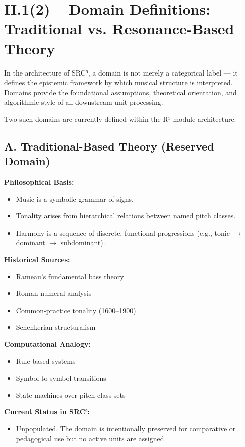 \section*{II.1(2) – Domain Definitions: Traditional vs. Resonance-Based Theory}

In the architecture of SRC⁹, a domain is not merely a categorical label — it defines the epistemic framework by which musical structure is interpreted. Domains provide the foundational assumptions, theoretical orientation, and algorithmic style of all downstream unit processing.

Two such domains are currently defined within the R³ module architecture:

\subsection*{A. Traditional-Based Theory (Reserved Domain)}

\textbf{Philosophical Basis:}
\begin{itemize}
    \item Music is a symbolic grammar of signs.
    \item Tonality arises from hierarchical relations between named pitch classes.
    \item Harmony is a sequence of discrete, functional progressions (e.g., tonic $\rightarrow$ dominant $\rightarrow$ subdominant).
\end{itemize}

\textbf{Historical Sources:}
\begin{itemize}
    \item Rameau’s fundamental bass theory
    \item Roman numeral analysis
    \item Common-practice tonality (1600–1900)
    \item Schenkerian structuralism
\end{itemize}

\textbf{Computational Analogy:}
\begin{itemize}
    \item Rule-based systems
    \item Symbol-to-symbol transitions
    \item State machines over pitch-class sets
\end{itemize}

\textbf{Current Status in SRC⁹:}

\begin{itemize}
    \item Unpopulated. The domain is intentionally preserved for comparative or pedagogical use but no active units are assigned.
\end{itemize}

